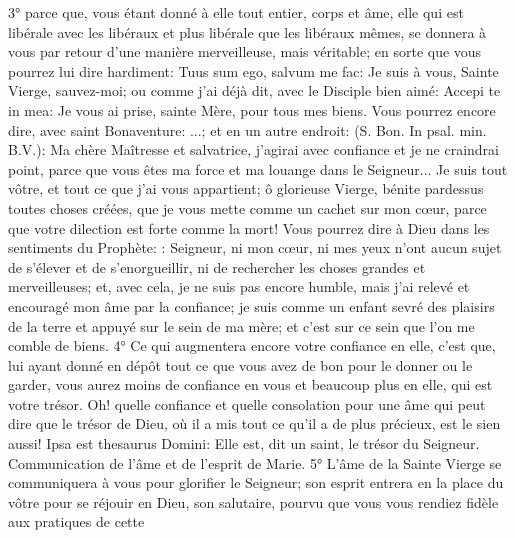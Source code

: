 3° parce que, vous étant donné à elle tout entier, corps et âme, elle qui est libérale avec les libéraux et plus libérale que les libéraux mêmes, se donnera à vous par retour d'une manière merveilleuse, mais véritable; en sorte que vous pourrez lui dire hardiment: Tuus sum ego, salvum me fac: Je suis à vous, Sainte Vierge, sauvez-moi; ou comme j'ai déjà dit, avec le Disciple bien aimé: Accepi te in mea: Je vous ai prise, sainte Mère, pour tous mes biens. Vous pourrez encore dire, avec saint Bonaventure: ...; et en un autre endroit:  (S. Bon. In psal. min. B.V.): Ma chère Maîtresse et salvatrice, j'agirai avec confiance et je ne craindrai point, parce que vous êtes ma force et ma louange dans le Seigneur... Je suis tout vôtre, et tout ce que j'ai vous appartient; ô glorieuse Vierge, bénite pardessus toutes choses créées, que je vous mette comme un cachet sur mon cœur, parce que votre dilection est forte comme la mort! Vous pourrez dire à Dieu dans les sentiments du Prophète: : Seigneur, ni mon cœur, ni mes yeux n'ont aucun sujet de s'élever et de s'enorgueillir, ni de rechercher les choses grandes et merveilleuses; et, avec cela, je ne suis pas encore humble, mais j'ai relevé et
encouragé mon âme par la confiance; je suis comme un enfant sevré des plaisirs de la terre et appuyé sur le sein
de ma mère; et c'est sur ce sein que l'on me comble de biens. 4° Ce qui augmentera encore votre confiance en
elle, c'est que, lui ayant donné en dépôt tout ce que vous avez de bon pour le donner ou le garder, vous aurez
moins de confiance en vous et beaucoup plus en elle, qui est votre trésor. Oh! quelle confiance et quelle
consolation pour une âme qui peut dire que le trésor de Dieu, où il a mis tout ce qu'il a de plus précieux, est le sien
aussi! Ipsa est thesaurus Domini: Elle est, dit un saint, le trésor du Seigneur.
Communication de l'âme et de l'esprit de Marie.
 5° L'âme de la Sainte Vierge se communiquera à vous pour glorifier le Seigneur; son esprit entrera en la
place du vôtre pour se réjouir en Dieu, son salutaire, pourvu que vous vous rendiez fidèle aux pratiques de cette
